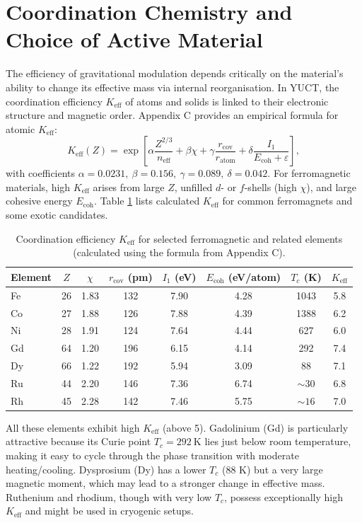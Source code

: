 \documentclass[12pt,a4paper]{article}
\newcommand{\Keff}{K_{\mathrm{eff}}}
\begin{document}
	\section{Coordination Chemistry and Choice of Active Material}
	\label{sec:chemistry}
	
	The efficiency of gravitational modulation depends critically on the material's ability to change its effective mass via internal reorganisation. In YUCT, the coordination efficiency \(\Keff\) of atoms and solids is linked to their electronic structure and magnetic order. Appendix C provides an empirical formula for atomic \(\Keff\):
	\[
	\Keff(Z) = \exp\left[\alpha \frac{Z^{2/3}}{n_{\text{eff}}} + \beta \chi + \gamma \frac{r_{\text{cov}}}{r_{\text{atom}}} + \delta \frac{I_1}{E_{\text{coh}} + \varepsilon}\right],
	\]
	with coefficients \(\alpha = 0.0231,\ \beta = 0.156,\ \gamma = 0.089,\ \delta = 0.042\). For ferromagnetic materials, high \(\Keff\) arises from large \(Z\), unfilled \(d\)- or \(f\)-shells (high \(\chi\)), and large cohesive energy \(E_{\text{coh}}\). Table \ref{tab:ferro-keff} lists calculated \(\Keff\) for common ferromagnets and some exotic candidates.
	
	\begin{table}[htbp]
		\centering
		\caption{Coordination efficiency \(\Keff\) for selected ferromagnetic and related elements (calculated using the formula from Appendix C).}
		\label{tab:ferro-keff}
		\begin{tabular}{lccccccc}
			\toprule
			Element & \(Z\) & \(\chi\) & \(r_{\text{cov}}\) (pm) & \(I_1\) (eV) & \(E_{\text{coh}}\) (eV/atom) & \(T_c\) (K) & \(\Keff\) \\
			\midrule
			Fe & 26 & 1.83 & 132 & 7.90 & 4.28 & 1043 & 5.8 \\
			Co & 27 & 1.88 & 126 & 7.88 & 4.39 & 1388 & 6.2 \\
			Ni & 28 & 1.91 & 124 & 7.64 & 4.44 & 627  & 6.0 \\
			Gd & 64 & 1.20 & 196 & 6.15 & 4.14 & 292  & 7.4 \\
			Dy & 66 & 1.22 & 192 & 5.94 & 3.09 & 88   & 7.1 \\
			Ru & 44 & 2.20 & 146 & 7.36 & 6.74 & \(\sim 30\) & 6.8 \\
			Rh & 45 & 2.28 & 142 & 7.46 & 5.75 & \(\sim 16\) & 7.0 \\
			\bottomrule
		\end{tabular}
	\end{table}
	
	All these elements exhibit high \(\Keff\) (above 5). Gadolinium (Gd) is particularly attractive because its Curie point \(T_c = 292\ \mathrm{K}\) lies just below room temperature, making it easy to cycle through the phase transition with moderate heating/cooling. Dysprosium (Dy) has a lower \(T_c\) (88 K) but a very large magnetic moment, which may lead to a stronger change in effective mass. Ruthenium and rhodium, though with very low \(T_c\), possess exceptionally high \(\Keff\) and might be used in cryogenic setups.
	
\end{document}
